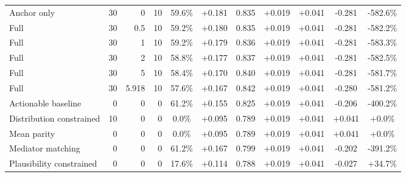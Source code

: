 \begin{table}[htbp]
\begin{tabular}{lrrrccccccc}
Anchor only & 30 & 0 & 10 & 59.6\% & +0.181 & 0.835 & +0.019 & +0.041 & -0.281 & -582.6\% \\
Full & 30 & 0.5 & 10 & 59.2\% & +0.180 & 0.835 & +0.019 & +0.041 & -0.281 & -582.2\% \\
Full & 30 & 1 & 10 & 59.2\% & +0.179 & 0.836 & +0.019 & +0.041 & -0.281 & -583.3\% \\
Full & 30 & 2 & 10 & 58.8\% & +0.177 & 0.837 & +0.019 & +0.041 & -0.281 & -582.5\% \\
Full & 30 & 5 & 10 & 58.4\% & +0.170 & 0.840 & +0.019 & +0.041 & -0.281 & -581.7\% \\
Full & 30 & 5.918 & 10 & 57.6\% & +0.167 & 0.842 & +0.019 & +0.041 & -0.280 & -581.2\% \\
Actionable baseline & 0 & 0 & 0 & 61.2\% & +0.155 & 0.825 & +0.019 & +0.041 & -0.206 & -400.2\% \\
Distribution constrained & 10 & 0 & 0 & 0.0\% & +0.095 & 0.789 & +0.019 & +0.041 & +0.041 & +0.0\% \\
Mean parity & 0 & 0 & 0 & 0.0\% & +0.095 & 0.789 & +0.019 & +0.041 & +0.041 & +0.0\% \\
Mediator matching & 0 & 0 & 0 & 61.2\% & +0.167 & 0.799 & +0.019 & +0.041 & -0.202 & -391.2\% \\
Plausibility constrained & 0 & 0 & 0 & 17.6\% & +0.114 & 0.788 & +0.019 & +0.041 & -0.027 & +34.7\% \\
\bottomrule
\end{tabular}
\end{table}